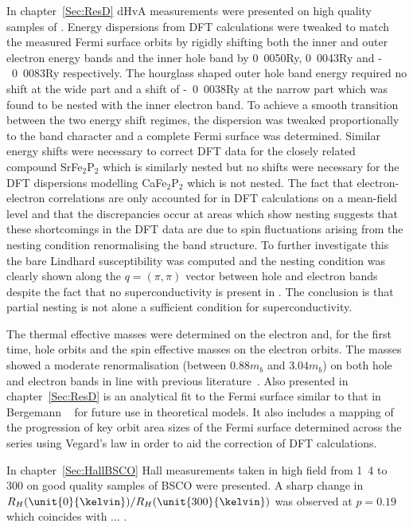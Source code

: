 
In chapter~\ref{Sec:ResD} \ac{dHvA} measurements were presented on high quality samples of \BaFeP. Energy dispersions from \ac{DFT} calculations were tweaked to match the measured Fermi surface orbits by rigidly shifting both the inner and outer electron energy bands and the inner hole band by \unit{0.0050}{\textrm{Ry}}, \unit{0.0043}{\textrm{Ry}} and \unit{-0.0083}{\textrm{Ry}} respectively. The hourglass shaped outer hole band energy required no shift at the wide part and a shift of \unit{-0.0038}{\textrm{Ry}} at the narrow part which was found to be nested with the inner electron band. To achieve a smooth transition between the two energy shift regimes, the dispersion was tweaked proportionally to the \DzTwo band character and a complete Fermi surface was determined. Similar energy shifts were necessary to correct \ac{DFT} data for the closely related compound SrFe$_2$P$_2$ which is similarly nested but no shifts were necessary for the \ac{DFT} dispersions modelling CaFe$_2$P$_2$ which is not nested. The fact that electron-electron correlations are only accounted for in \ac{DFT} calculations on a mean-field level and that the discrepancies occur at areas which show nesting suggests that these shortcomings in the \ac{DFT} data are due to spin fluctuations arising from the nesting condition renormalising the band structure. To further investigate this the bare Lindhard susceptibility was computed and the nesting condition was clearly shown along the $q = (\pi, \pi)$ vector between hole and electron bands despite the fact that no superconductivity is present in \BaFeP. The conclusion is that partial nesting is not alone a sufficient condition for superconductivity.

The thermal effective masses were determined on the electron and, for the first time, hole orbits and the spin effective masses on the electron orbits. The masses showed a moderate renormalisation (between $\unit{0.88}{m_b}$ and $\unit{3.04}{m_b}$) on both hole and electron bands in line with previous literature~\cite{Shishido2010}.  Also presented in chapter~\ref{Sec:ResD} is an analytical fit to the Fermi surface similar to that in Bergemann \etal~\cite{Bergemann2000} for future use in theoretical models. It also includes a mapping of the progression of key orbit area sizes of the Fermi surface determined across the \BaFePAs series using Vegard's law in order to aid the correction of \ac{DFT} calculations.

In chapter~\ref{Sec:HallBSCO} Hall measurements taken in high field from \unit{1.4}{\kelvin} to \unit{300}{\kelvin} on good quality samples of \ac{BSCO} were presented. A sharp change in $R_H(\unit{0}{\kelvin})/R_H(\unit{300}{\kelvin})$ was observed at $p=0.19$ which coincides with ... .

